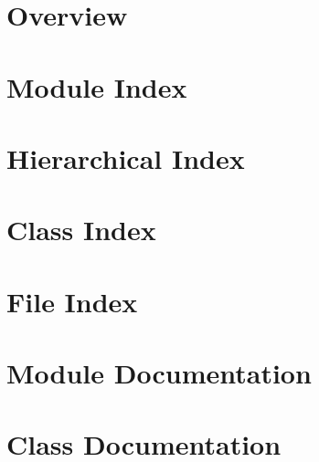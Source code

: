 \documentclass[twoside]{book}
\newcommand{\+}{\discretionary{\mbox{\scriptsize$\hookleftarrow$}}{}{}}
\begin{document}
\chapter{Overview}
\label{overview}

\chapter{Module Index}

\chapter{Hierarchical Index}

\chapter{Class Index}

\chapter{File Index}

\chapter{Module Documentation}


\chapter{Class Documentation}





























































\end{document}
